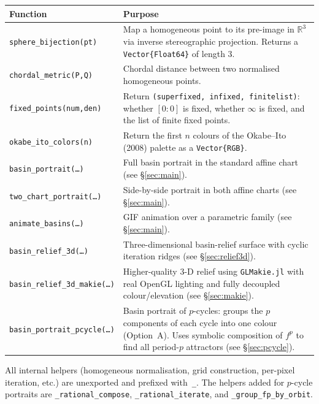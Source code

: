 \documentclass[11pt,a4paper]{article}
\theoremstyle{definition}
\newcommand{\R}{\mathbb{R}}
\newcommand{\pkg}[1]{\texttt{#1}}
\newcommand{\fn}[1]{\texttt{#1}}
\begin{document}
\begin{center}
\renewcommand{\arraystretch}{1.3}
\begin{tabular}{lp{8.5cm}}
\toprule
Function & Purpose \\
\midrule
\fn{sphere\_bijection(pt)} &
  Map a homogeneous point to its pre-image in $\R^3$ via inverse
  stereographic projection.  Returns a \texttt{Vector\{Float64\}} of length 3.\\
\fn{chordal\_metric(P,Q)} &
  Chordal distance between two normalised homogeneous points.\\
\fn{fixed\_points(num,den)} &
  Return \texttt{(superfixed, infixed, finitelist)}: whether $[0:0]$ is fixed,
  whether $\infty$ is fixed, and the list of finite fixed points.\\
\fn{okabe\_ito\_colors(n)} &
  Return the first $n$ colours of the Okabe--Ito (2008) palette as a
  \texttt{Vector\{RGB\}}.\\
\fn{basin\_portrait(\ldots)} &
  Full basin portrait in the standard affine chart (see \S\ref{sec:main}).\\
\fn{two\_chart\_portrait(\ldots)} &
  Side-by-side portrait in both affine charts (see \S\ref{sec:main}).\\
\fn{animate\_basins(\ldots)} &
  GIF animation over a parametric family (see \S\ref{sec:main}).\\
\fn{basin\_relief\_3d(\ldots)} &
  Three-dimensional basin-relief surface with cyclic iteration ridges
  (see \S\ref{sec:relief3d}).\\
\fn{basin\_relief\_3d\_makie(\ldots)} &
  Higher-quality 3-D relief using \pkg{GLMakie.jl} with real OpenGL
  lighting and fully decoupled colour/elevation (see \S\ref{sec:makie}).\\
\fn{basin\_portrait\_pcycle(\ldots)} &
  Basin portrait of $p$-cycles: groups the $p$ components of each
  cycle into one colour (Option~A).  Uses symbolic composition of
  $f^p$ to find all period-$p$ attractors (see \S\ref{sec:pcycle}).\\
\bottomrule
\end{tabular}
\end{center}

All internal helpers (homogeneous normalisation, grid construction,
per-pixel iteration, etc.) are unexported and prefixed with~\texttt{\_}.
The helpers added for $p$-cycle portraits are
\texttt{\_rational\_compose}, \texttt{\_rational\_iterate}, and
\texttt{\_group\_fp\_by\_orbit}.

\end{document}
